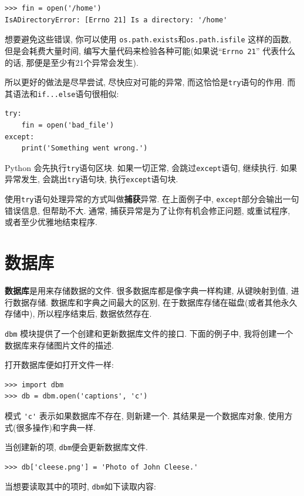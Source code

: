 \documentclass[10pt]{book}
\begin{document}
\begin{verbatim}
>>> fin = open('/home')
IsADirectoryError: [Errno 21] Is a directory: '/home'
\end{verbatim}
%
想要避免这些错误, 你可以使用 {\tt os.path.exists}和{\tt os.path.isfile} 这样的函数, 
但是会耗费大量时间, 编写大量代码来检验各种可能(如果说``{\tt Errno 21}'' 代表什么的话, 
那便是至少有21个异常会发生). 


所以更好的做法是尽早尝试, 尽快应对可能的异常, 而这恰恰是{\tt try}语句的作用. 
而其语法和{\tt if...else}语句很相似:

\begin{verbatim}
try:    
    fin = open('bad_file')
except:
    print('Something went wrong.')
\end{verbatim}
%
Python 会先执行{\tt try}语句区块. 
如果一切正常, 会跳过{\tt except}语句, 继续执行. 
如果异常发生, 会跳出{\tt try}语句块, 执行{\tt except}语句块. 

使用{\tt try}语句处理异常的方式叫做{\bf 捕获}异常. 
在上面例子中, {\tt except}部分会输出一句错误信息, 但帮助不大. 
通常, 捕获异常是为了让你有机会修正问题, 或重试程序, 或者至少优雅地结束程序. 


\section{数据库}

{\bf 数据库}是用来存储数据的文件. 
很多数据库都是像字典一样构建, 从键映射到值, 进行数据存储. 
数据库和字典之间最大的区别, 在于数据库存储在磁盘(或者其他永久存储中), 
所以程序结束后, 数据依然存在. 
 

 {\tt dbm} 模块提供了一个创建和更新数据库文件的接口. 
下面的例子中, 我将创建一个数据库来存储图片文件的描述. 

打开数据库便如打开文件一样:

\begin{verbatim}
>>> import dbm
>>> db = dbm.open('captions', 'c')
\end{verbatim}
%

模式 \verb"'c'" 表示如果数据库不存在, 则新建一个. 
其结果是一个数据库对象, 使用方式(很多操作)和字典一样.

当创建新的项, {\tt dbm}便会更新数据库文件.

\begin{verbatim}
>>> db['cleese.png'] = 'Photo of John Cleese.'
\end{verbatim}
%
当想要读取其中的项时,  {\tt dbm}如下读取内容:
\end{document}
